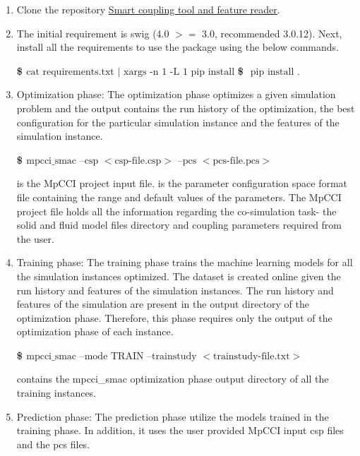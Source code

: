 \begin{enumerate}
\item Clone the repository  \href{https://gitlab.scai.fraunhofer.de/deepan.chakravarthi.padmanabhan/smart_coupling/tree/master}{Smart coupling tool and feature reader}. 
\item The initial requirement is swig (4.0 $>=$ 3.0, recommended 3.0.12). Next, install all the requirements to use the package using the below commands. 

\textbf{\$ $\text{cat requirements.txt $|$ xargs -n 1 -L 1 pip install}$}
\newline
\noindent \textbf{\$ $\text{ pip install .} $}

\item Optimization phase: The optimization phase optimizes a given simulation problem and the output contains the run history of the optimization, the best configuration for the particular simulation instance and the features of the simulation instance.

\textbf{\$ $ \text{mpcci\_smac --csp $<$csp-file.csp$>$ --pcs $<$pcs-file.pcs$>$ } $}

 is the MpCCI project input file.  is the parameter configuration space format file containing the range and default values of the parameters. The MpCCI project file holds all the information regarding the co-simulation task- the solid and fluid model files directory and coupling parameters required from the user.

\item Training phase: The training phase trains the machine learning models for all the simulation instances optimized. The dataset is created online given the run history and features of the simulation instances. The run history and features of the simulation are present in the output directory of the optimization phase. Therefore, this phase requires only the output of the optimization phase of each instance.

\textbf{\$ $\text{mpcci\_smac --mode TRAIN --trainstudy $<$trainstudy-file.txt$>$}$}

 contains the mpcci\_smac optimization phase output directory of all the training instances.

\item Prediction phase: The prediction phase utilize the models trained in the training phase. In addition, it uses the user provided MpCCI input csp files and the pcs files.


\end{enumerate}
